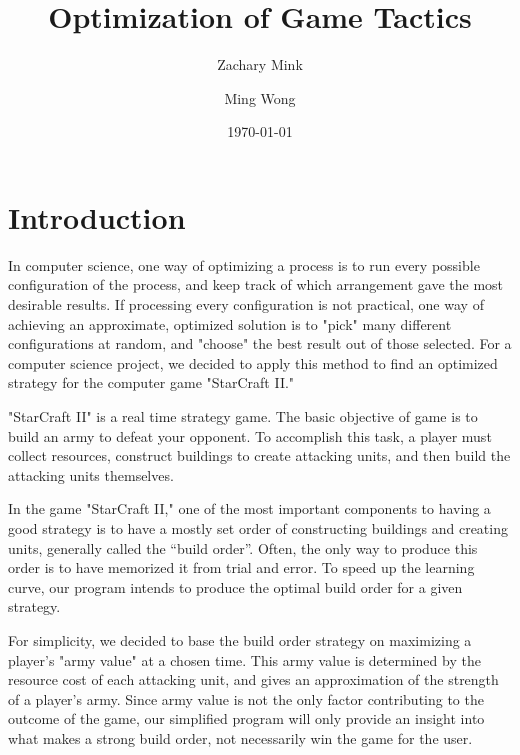 \documentclass[prb,twocolumn]{revtex4}
\begin{document}
\title{Optimization of Game Tactics}

\author{Zachary Mink}
\author{Ming Wong}

\date{\today}

\begin{abstract}




\end{abstract}

\maketitle

\section{Introduction}
In computer science, one way of optimizing a process is to run every possible configuration of the process, and keep track of which arrangement gave the most desirable results.  If processing every configuration is not practical, one way of achieving an approximate, optimized solution is to "pick" many different configurations at random, and "choose" the best result out of those selected.  For a computer science project, we decided to apply this method to find an optimized strategy for the computer game "StarCraft II."

"StarCraft II" is a real time strategy game.  The basic objective of game is to build an army to defeat your opponent.  To accomplish this task, a player must collect resources, construct buildings to create attacking units, and then build the attacking units themselves.

In the game "StarCraft II," one of the most important components to having a good strategy is to have a mostly set order of constructing buildings and creating units, generally called the ``build order''.  Often, the only way to produce this order is to have memorized it from trial and error.  To speed up the learning curve, our program intends to produce the optimal build order for a given strategy.

For simplicity, we decided to base the build order strategy on maximizing a player's "army value" at a chosen time.  This army value is determined by the resource cost of each attacking unit, and gives an approximation of the strength of a player's army.  Since army value is not the only factor contributing to the outcome of the game, our simplified program will only provide an insight into what makes a strong build order, not necessarily win the game for the user.
\end{document}
